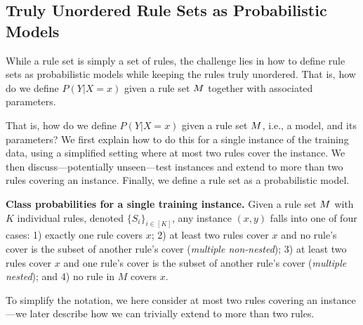 \subsection{Truly Unordered Rule Sets as Probabilistic Models} \label{subsec:probRuleSet}

While a rule set is simply a set of rules, the challenge lies in how to define rule sets as probabilistic models while keeping the rules truly unordered. That is, how do we define $P(Y|X=x)$ given a rule set $M$ together with associated parameters. 

That is, how do we define $P(Y|X=x)$ given a rule set $M$, i.e., a model, and its parameters? We first explain how to do this for a single instance of the training data, using a simplified setting where at most two rules cover the instance. We then discuss---potentially unseen---test instances and extend to more than two rules covering an instance. Finally, we define a rule set as a probabilistic model.


\medskip \noindent
\textbf{Class probabilities for a single training instance.} 
Given a rule set $M$ with $K$ individual rules, denoted $\{S_i\}_{i \in [K]}$, any instance $(x,y)$ falls into one of four cases: 1) exactly one rule covers $x$; 2) at least two rules cover $x$ and no rule's cover is the subset of another rule's cover (\emph{multiple non-nested}); 3) at least two rules cover $x$ and one rule's cover is the subset of another rule's cover (\emph{multiple nested}); and 4) no rule in $M$ covers $x$.

To simplify the notation, we here consider at most two rules covering an instance---we later describe how we can trivially extend to more than two rules.


